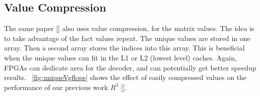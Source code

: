 \subsection{Value Compression}
\label{sec:value}
\par The same paper [\cite{prelim:kourtis}] also uses value compression, for the matrix values. The idea is to take advantage of the fact values repeat. The unique values are stored in one array. Then a second array stores the indices into this array. This is beneficial when the unique values can fit in the L1 or L2 (lowest level) caches. Again, FPGAs can dedicate area for the decoder, and can potentially get better speedup results. \figurename~\ref{fig:uniqueVgflops} shows the effect of easily compressed values on the performance of our previous work $R^3$ [\cite{prelim:townsend}].

